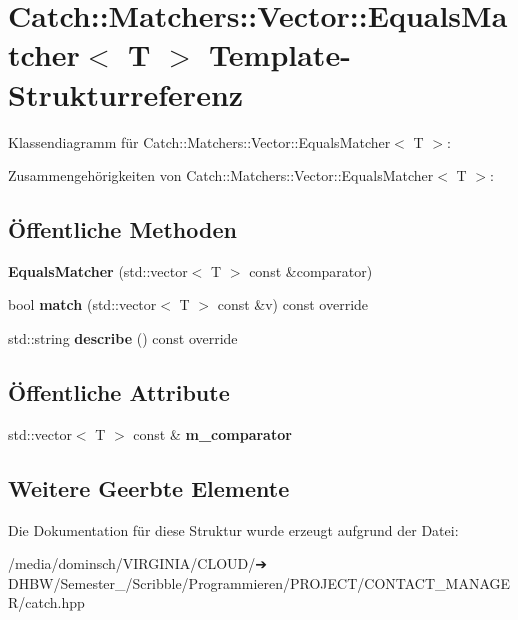 \hypertarget{structCatch_1_1Matchers_1_1Vector_1_1EqualsMatcher}{}\section{Catch\+:\+:Matchers\+:\+:Vector\+:\+:Equals\+Matcher$<$ T $>$ Template-\/\+Strukturreferenz}
\label{structCatch_1_1Matchers_1_1Vector_1_1EqualsMatcher}


Klassendiagramm für Catch\+:\+:Matchers\+:\+:Vector\+:\+:Equals\+Matcher$<$ T $>$\+:


Zusammengehörigkeiten von Catch\+:\+:Matchers\+:\+:Vector\+:\+:Equals\+Matcher$<$ T $>$\+:
\subsection*{Öffentliche Methoden}
\begin{DoxyCompactItemize}
\item 
\mbox{\label{structCatch_1_1Matchers_1_1Vector_1_1EqualsMatcher_a3846c47780d1991dcfe87aefded98008}} 
{\bfseries Equals\+Matcher} (std\+::vector$<$ T $>$ const \&comparator)
\item 
\mbox{\label{structCatch_1_1Matchers_1_1Vector_1_1EqualsMatcher_a2d96cca58a44151fddc5257eda3305da}} 
bool {\bfseries match} (std\+::vector$<$ T $>$ const \&v) const override
\item 
\mbox{\label{structCatch_1_1Matchers_1_1Vector_1_1EqualsMatcher_a36b5f7ecada4081d6c65bebe8ddea6f4}} 
std\+::string {\bfseries describe} () const override
\end{DoxyCompactItemize}
\subsection*{Öffentliche Attribute}
\begin{DoxyCompactItemize}
\item 
\mbox{\label{structCatch_1_1Matchers_1_1Vector_1_1EqualsMatcher_a56f7aa6f110a12b1b9aeb0cabbc9d755}} 
std\+::vector$<$ T $>$ const  \& {\bfseries m\+\_\+comparator}
\end{DoxyCompactItemize}
\subsection*{Weitere Geerbte Elemente}


Die Dokumentation für diese Struktur wurde erzeugt aufgrund der Datei\+:\begin{DoxyCompactItemize}
\item 
/media/dominsch/\+V\+I\+R\+G\+I\+N\+I\+A/\+C\+L\+O\+U\+D/➔ D\+H\+B\+W/\+Semester\+\_/\+Scribble/\+Programmieren/\+P\+R\+O\+J\+E\+C\+T/\+C\+O\+N\+T\+A\+C\+T\+\_\+\+M\+A\+N\+A\+G\+E\+R/catch.\+hpp\end{DoxyCompactItemize}
